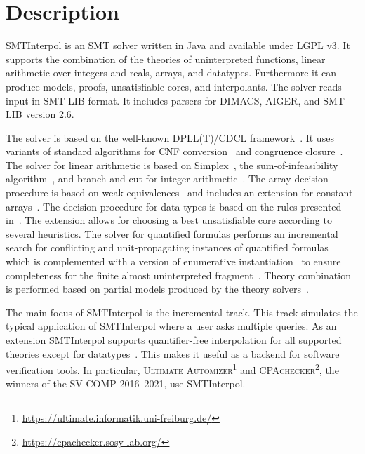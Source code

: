 \documentclass[a4paper]{easychair}
\title{\SI with resolution proofs\\{\large Versions\version}}
\author{Jochen Hoenicke \and Tanja Schindler}  %
\institute{
  University of Freiburg\\
  \email{\{hoenicke,schindle\}@informatik.uni-freiburg.de}\\[1ex]
  \today
}
\newcommand\SI{SMTInterpol\xspace}
\begin{document}
\maketitle
\section*{Description}
\SI is an SMT solver written in Java and available under LGPL v3.
It supports the combination of the theories of uninterpreted functions, linear arithmetic over integers and reals, arrays, and datatypes.
Furthermore it can produce models, proofs, unsatisfiable cores, and interpolants.
The solver reads input in SMT-LIB format.
It includes parsers for DIMACS, AIGER, and SMT-LIB version 2.6.

The solver is based on the well-known DPLL(T)/CDCL framework~\cite{DBLP:conf/cav/GanzingerHNOT04}.
It uses variants of standard algorithms for CNF conversion~\cite{DBLP:journals/jsc/PlaistedG86} and congruence closure~\cite{DBLP:conf/rta/NieuwenhuisO05}.
The solver for linear arithmetic is based on Simplex~\cite{DBLP:conf/cav/DutertreM06}, the sum-of-infeasibility algorithm~\cite{DBLP:conf/fmcad/KingBD13}, and branch-and-cut for integer arithmetic~\cite{DBLP:conf/cav/ChristH15,DBLP:conf/cav/DilligDA09}.
The array decision procedure is based on weak equivalences~\cite{DBLP:conf/frocos/ChristH15} and includes an extension for constant arrays~\cite{DBLP:conf/vmcai/HoenickeS19}.
The decision procedure for data types is based on the rules presented in~\cite{DBLP:journals/jsat/BarrettST07}.
The extension allows for choosing a best unsatisfiable core according to several heuristics.
The solver for quantified formulas performs an incremental search for conflicting and unit-propagating instances of quantified formulas~\cite{DBLP:conf/vmcai/HoenickeS21} which is complemented with a version of enumerative instantiation~\cite{DBLP:conf/tacas/ReynoldsBF18} to ensure completeness for the finite almost uninterpreted fragment~\cite{DBLP:conf/cav/GeM09}.
Theory combination is performed based on partial models produced by the theory solvers~\cite{DBLP:journals/entcs/MouraB08}.

The main focus of \SI is the incremental track.
This track simulates the typical application of \SI where a user asks multiple queries.
As an extension \SI supports quantifier-free interpolation for all supported theories except for datatypes~\cite{DBLP:journals/jar/ChristH16,DBLP:conf/cade/HoenickeS18,DBLP:conf/vmcai/HoenickeS19}.
This makes it useful as a backend for software verification tools.
In particular, \textsc{Ultimate Automizer}\footnote{\url{https://ultimate.informatik.uni-freiburg.de/}} and \textsc{CPAchecker}\footnote{\url{https://cpachecker.sosy-lab.org/}}, the winners of the SV-COMP 2016--2021, use \SI.
\end{document}
